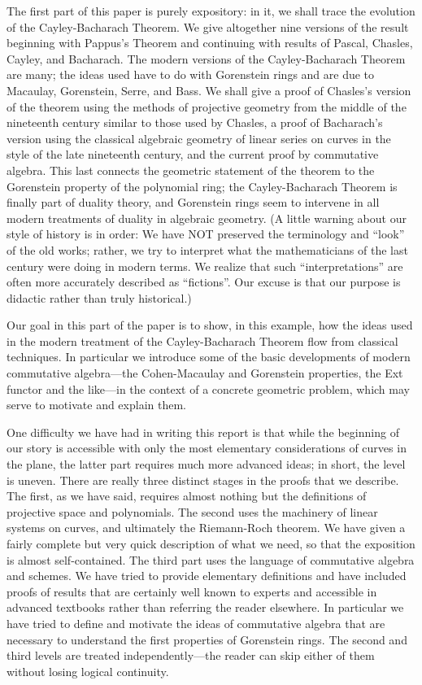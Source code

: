 \documentclass{bull-l}
\theoremstyle{pplain}
\theoremstyle{definition}
\begin{document}
The first part of this paper is purely expository: in it, we shall trace the
evolution of the Cayley-Bacharach Theorem.  We give altogether nine versions of
the result beginning with Pappus's Theorem and continuing with results of
Pascal, Chasles, Cayley, and Bacharach.  The modern versions of the
Cayley-Bacharach Theorem are many; the ideas used have to do with Gorenstein
rings and are due to Macaulay, Gorenstein, Serre, and Bass.  We shall give a
proof of Chasles's version of the theorem using the methods of projective
geometry from the middle of the nineteenth century similar to those used 
by Chasles,
a  proof of Bacharach's version using the classical algebraic geometry of 
linear series on curves in the style of the late nineteenth century, and the
current proof by commutative algebra.   This last connects the geometric
statement of the theorem to the Gorenstein property of the polynomial ring; the
Cayley-Bacharach Theorem is finally part of duality theory, and Gorenstein
rings seem to intervene in all modern treatments of duality in algebraic
geometry.  (A little warning about our style of history is in order:  We have
NOT preserved the terminology and ``look'' of the old works; rather, we try to
interpret what the mathematicians of the last century were doing in modern
terms.  We realize that such ``interpretations'' are often more accurately
described as ``fictions''.  Our excuse is that our purpose is didactic rather
than truly historical.)

Our goal in this part of the paper is to show, in this example, how
the ideas used in the modern treatment of the Cayley-Bacharach Theorem flow
from classical techniques.  In particular we introduce some of the basic
developments of modern commutative algebra---the Cohen-Macaulay and Gorenstein 
properties, the Ext functor and the like---in the context of a concrete
geometric problem, which may serve to motivate and explain them.

One difficulty we have had in writing this report is that while the beginning
of our story is accessible with only the most elementary considerations of
curves in the plane, the latter part requires much more advanced ideas; in
short, the level is uneven.  There are really three distinct stages in the
proofs that we describe.  The first, as we have said, requires almost nothing
but the definitions of projective space and polynomials.  The second uses the
machinery of linear systems on curves, and ultimately the Riemann-Roch theorem.
We have given a fairly complete but very quick description of what we need, so
that the exposition is almost self-contained.  The third part uses the language
of commutative algebra and  schemes.   
We have tried to provide elementary definitions and have included
proofs of results that are certainly well known to experts and accessible in
advanced textbooks rather than referring the reader elsewhere.  In particular
we have tried to define and motivate the ideas of commutative algebra that are
necessary to understand the first properties of Gorenstein rings.  The second
and third levels are treated independently---the reader can skip either of them
without losing logical continuity.
\end{document}
